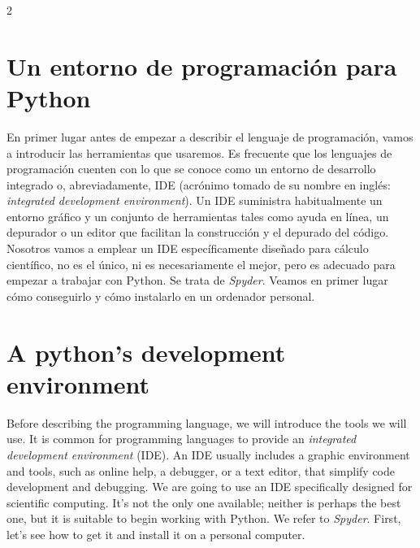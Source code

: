 \begin{paracol}{2}
\section[Un entorno de programación para Python]{Un entorno de programación para Python}
En primer lugar antes de empezar a describir el lenguaje de programación, vamos a introducir las herramientas  que usaremos. Es frecuente que los lenguajes de programación cuenten con lo que se conoce como un entorno de desarrollo integrado o, abreviadamente, IDE (acrónimo tomado de su nombre en inglés: \emph{integrated development environment}). Un IDE suministra habitualmente un entorno gráfico y un conjunto de herramientas tales como ayuda en línea, un depurador o un editor que facilitan la construcción y el depurado del código. Nosotros vamos a emplear un IDE específicamente diseñado para cálculo científico, no es el único, ni es necesariamente el mejor, pero es adecuado para empezar a trabajar con Python. Se trata de \emph{Spyder}. Veamos en primer lugar cómo conseguirlo y cómo instalarlo en un ordenador personal.

\switchcolumn
\section{A python's development environment}
Before describing the programming language, we will introduce the tools we will use. It is common for programming languages to provide an \emph{integrated development environment} (IDE). An IDE usually includes a graphic environment and tools, such as online help,  a debugger, or a text editor, that simplify code development and debugging. We are going to use an IDE specifically designed for scientific computing. It's not the only one available; neither is perhaps the best one, but it is suitable to begin working with Python. We refer to \emph{Spyder}. First, let's see how to get it and install it on a personal computer.
\end{paracol}
